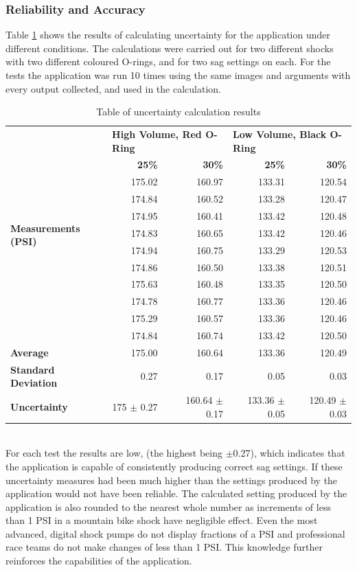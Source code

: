 		\subsubsection{Reliability and Accuracy}
			Table \ref{tab:uncertainty} shows the results of calculating uncertainty for the application under different conditions. The calculations were carried out for two different shocks with two different coloured O-rings, and for two sag settings on each. For the tests the application was run 10 times using the same images and arguments with every output collected, and used in the calculation.
			\begin{table}[h!]
				\centering
				\caption{Table of uncertainty calculation results}
				\label{tab:uncertainty}
				\begin{tabular}{|l|r|r|r|r|}
					\hline
					\multirow{12}{7em}{\bfseries Measurements (PSI)}&\multicolumn{2}{|l|}{\bfseries High Volume, Red O-Ring}&\multicolumn{2}{|l|}{\bfseries Low Volume, Black O-Ring}\\
					\cline{2-5}&\bfseries 25\%&\bfseries 30\%&\bfseries 25\%&\bfseries 30\%\\
					\hline
					&175.02&160.97&133.31&120.54\\
					&174.84&160.52&133.28&120.47\\
					&174.95&160.41&133.42&120.48\\
					&174.83&160.65&133.42&120.46\\
					&174.94&160.75&133.29&120.53\\
					&174.86&160.50&133.38&120.51\\
					&175.63&160.48&133.35&120.50\\
					&174.78&160.77&133.36&120.46\\
					&175.29&160.57&133.36&120.46\\
					&174.84&160.74&133.42&120.50\\
					\hline
					\bfseries Average&175.00&160.64&133.36&120.49\\
					\bfseries Standard Deviation&0.27&0.17&0.05&0.03\\
					\bfseries Uncertainty&175 $\pm$ 0.27&160.64 $\pm$ 0.17&133.36 $\pm$ 0.05&120.49 $\pm$ 0.03\\
					\hline
				\end{tabular}
			\end{table}
			\\
			For each test the results are low, (the highest being $\pm$0.27), which indicates that the application is capable of consistently producing correct sag settings. If these uncertainty measures had been  much higher than the settings produced by the application would not have been reliable. The calculated setting produced by the application is also rounded to the nearest whole number as increments  of less than 1 PSI in a mountain bike shock have  negligible effect. Even the most advanced, digital shock pumps do not display fractions of a PSI and professional race teams do not make changes of less than 1 PSI. This knowledge further reinforces the capabilities of the application.
